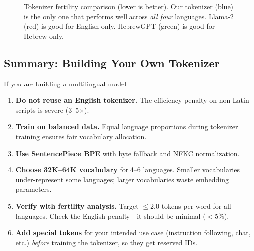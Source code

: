 \documentclass[11pt,a4paper]{article}
\begin{document}
\begin{figure}[H]
\centering
{}
\caption{Tokenizer fertility comparison (lower is better). Our tokenizer (blue) is the only one that performs well across \emph{all four} languages. Llama-2 (red) is good for English only. HebrewGPT (green) is good for Hebrew only.}
\label{fig:fertility_guide}
\end{figure}

\subsection{Summary: Building Your Own Tokenizer}

If you are building a multilingual model:

\begin{enumerate}
    \item \textbf{Do not reuse an English tokenizer.} The efficiency penalty on non-Latin scripts is severe (3--5$\times$).
    
    \item \textbf{Train on balanced data.} Equal language proportions during tokenizer training ensures fair vocabulary allocation.
    
    \item \textbf{Use SentencePiece BPE} with byte fallback and NFKC normalization.
    
    \item \textbf{Choose 32K--64K vocabulary} for 4--6 languages. Smaller vocabularies under-represent some languages; larger vocabularies waste embedding parameters.
    
    \item \textbf{Verify with fertility analysis.} Target $\leq$2.0 tokens per word for all languages. Check the English penalty---it should be minimal ($<$5\%).
    
    \item \textbf{Add special tokens} for your intended use case (instruction following, chat, etc.) \emph{before} training the tokenizer, so they get reserved IDs.
\end{enumerate}
\end{document}
